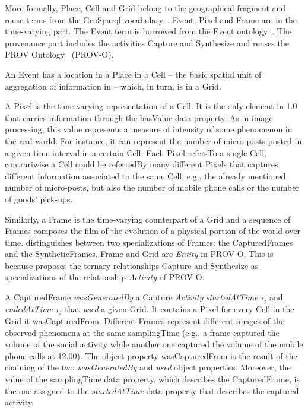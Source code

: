 More formally, \textsf{Place}, \textsf{Cell} and \textsf{Grid} belong to the geographical fragment and reuse terms from the GeoSparql vocabulary~\cite{battle2011geosparql}. 
\textsf{Event}, \textsf{Pixel} and \textsf{Frame} are in the time-varying part. The \textsf{Event} term is borrowed from the Event ontology~\cite{RaimondAbdallahEventOntology2007}. 
The provenance part includes the activities \textsf{Capture} and \textsf{Synthesize} and reuses the PROV Ontology~\cite{w3c-prov-o} (PROV-O).

An \textsf{Event} has a \textsf{location} in a \textsf{Place} in a \textsf{Cell} -- the basic spatial unit of aggregation of information in \frappe{} -- which, in turn, is in a \textsf{Grid}.

A \textsf{Pixel} is the time-varying representation of a \textsf{Cell}. It is the only element in \frappe{} 1.0 that carries information through the \textsf{hasValue} data property. As in image processing, this value represents a measure of intensity of some phenomenon in the real world. For instance, it can represent the number of micro-posts posted in a given time interval in a certain \textsf{Cell}. Each \textsf{Pixel} \textsf{refersTo} a single \textsf{Cell}, contrariwise a \textsf{Cell} could be \textsf{referredBy} many different \textsf{Pixel}s that captures different information associated to the same \textsf{Cell}, e.g., the already mentioned number of micro-posts, but also the number of mobile phone calls or the number of goods' pick-ups.

Similarly, a \textsf{Frame} is the time-varying counterpart of a \textsf{Grid} and a sequence of \textsf{Frame}s composes the film of the evolution of a physical portion of the world over time. 
\frappe{} distinguishes between two specializations of \textsf{Frame}s: the \textsf{CapturedFrame}s and the \textsf{SyntheticFrame}s. 
\textsf{Frame} and \textsf{Grid} are \textit{Entity} in PROV-O. This is because \frappe{} proposes the ternary relationships \textsf{Capture} and \textsf{Synthesize} as specializations of the relationship \textit{Activity} of PROV-O.

A \textsf{CapturedFrame} \textit{wasGeneratedBy} a \textsf{Capture} \textit{Activity} \textit{startedAtTime} $\tau_i$ and \textit{endedAtTime} $\tau_j$ that \textit{used} a given \textsf{Grid}. It \textsf{contains} a \textsf{Pixel} for every \textsf{Cell} in the \textsf{Grid} it \textsf{wasCapturedFrom}. Different \textsf{Frame}s represent different images of the observed phenomena at the same \textsf{samplingTime} (e.g., a frame captured the volume of the social activity while another one captured the volume of the mobile phone calls at 12.00).
The object property \textsf{wasCapturedFrom} is the result of the chaining of the two \textit{wasGeneratedBy} and \textit{used} object properties. Moreover, the value of the \textsf{samplingTime} data property, which describes the \textsf{CapturedFrame}, is the one assigned to the \textit{startedAtTime} data property that describes the captured activity. 

